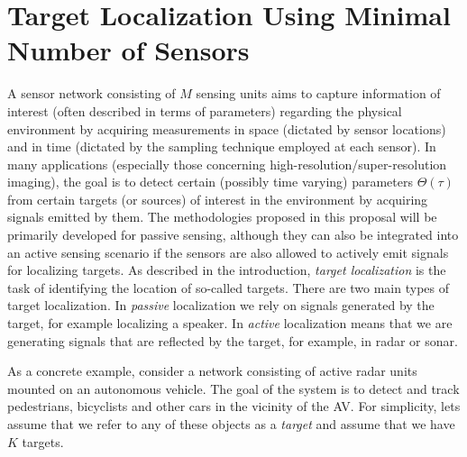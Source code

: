 \section{Target Localization Using Minimal Number of Sensors}

A sensor network consisting of $M$ sensing units aims to capture information of interest (often described in terms of parameters) regarding the physical environment by acquiring measurements in space (dictated by sensor locations) and in time (dictated by the sampling technique employed at each sensor). In many applications (especially those concerning high-resolution/super-resolution imaging), the goal is to detect certain (possibly time varying) parameters $\Theta(\tau)$ from certain targets (or sources) of interest in the environment by acquiring signals emitted by them. The methodologies proposed in this proposal will be primarily developed for passive sensing, although they can also be integrated into an active sensing scenario if the sensors are also allowed to actively emit signals for localizing targets.
\filcenter
{}
As described in the introduction, {\em target localization} is the task of identifying the location of so-called targets. There are two main types of target localization. In {\em passive} localization we rely on signals generated by the target, for example localizing a speaker.   In {\em active} localization means that we are generating signals that are reflected by the target, for example, in radar or sonar.

As a concrete example, consider a network consisting of active radar units mounted on an autonomous vehicle. The goal of the system is to detect and track pedestrians, bicyclists and other cars in the vicinity of the AV. For simplicity, lets assume that we refer to any of these objects as a {\em target} and assume that we have $K$ targets.

